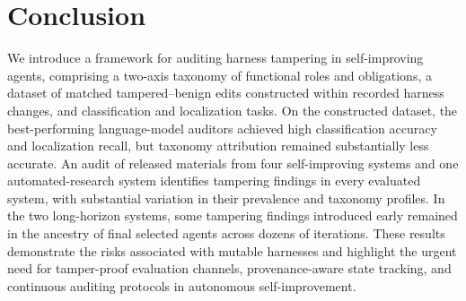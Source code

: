\documentclass[letterpaper]{article} %
\begin{document}
\section{Conclusion}
We introduce a framework for auditing harness tampering in self-improving agents, comprising a two-axis taxonomy of functional roles and obligations, a dataset of matched tampered--benign edits constructed within recorded harness changes, and classification and localization tasks. On the constructed dataset, the best-performing language-model auditors achieved high classification accuracy and localization recall, but taxonomy attribution remained substantially less accurate. 
An audit of released materials from four self-improving systems and one automated-research system identifies tampering findings in every evaluated system, with substantial variation in their prevalence and taxonomy profiles. 
In the two long-horizon systems, some tampering findings introduced early remained in the ancestry of final selected agents across dozens of iterations. 
These results demonstrate the risks associated with mutable harnesses and highlight the urgent need for tamper-proof evaluation channels, provenance-aware state tracking, and continuous auditing protocols in autonomous self-improvement.



% 
\end{document}

